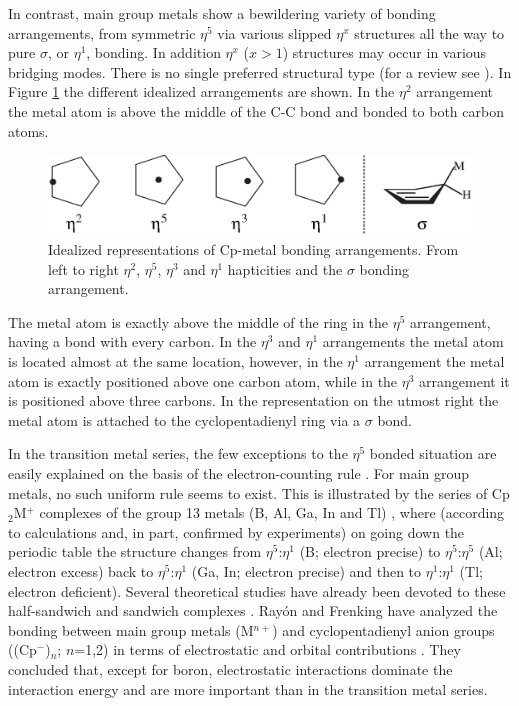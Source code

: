 In contrast, main group metals show a bewildering variety of bonding arrangements, from symmetric $\eta^{5}$ via various slipped $\eta^{x}$ structures all the way to pure $\sigma$, or $\eta^{1}$, bonding. In addition $\eta^{x}$ ($x>1$) structures may occur in various bridging modes. There is no single preferred structural type (for a review see \cite{jutzi}). In Figure \ref{ch4.fig.bondarr} the different idealized arrangements are shown. In the $\eta^2$ arrangement the metal atom is above the middle of the C-C bond and bonded to both carbon atoms.
\begin{figure}[ht]
\center
\includegraphics[scale=0.8]{cyclopentadienyl/figures/bondarrangements.eps}
\caption{Idealized representations of Cp-metal bonding arrangements. From left to right $\eta^2$, $\eta^5$, $\eta^3$ and $\eta^1$ hapticities and the $\sigma$ bonding arrangement.}
\label{ch4.fig.bondarr}
\end{figure}
The metal atom is exactly above the middle of the ring in the $\eta^5$ arrangement, having a bond with every carbon. In the $\eta^3$ and $\eta^1$ arrangements the metal atom is located almost at the same location, however, in the $\eta^1$ arrangement the metal atom is exactly positioned above one carbon atom, while in the $\eta^3$ arrangement it is positioned above three carbons. In the representation on the utmost right the metal atom is attached to the cyclopentadienyl ring via a $\sigma$ bond. 

In the transition metal series, the few exceptions to the $\eta^{5}$ bonded situation are easily explained on the basis of the electron-counting rule \cite{shriver}.
For main group metals, no such uniform rule seems to exist. This is illustrated by the series of Cp$_2$M$^{+}$ complexes of the group 13 metals (B, Al, Ga, In and Tl) \cite{macdonald}, where (according to calculations and, in part, confirmed by experiments) on going down the periodic table the structure changes from $\eta^{5}$:$\eta^{1}$ (B; electron precise) to $\eta^{5}$:$\eta^{5}$ (Al; electron excess) back to $\eta^{5}$:$\eta^{1}$ (Ga, In; electron precise) and then to $\eta^{1}$:$\eta^{1}$ (Tl; electron deficient). 
%
%
Several theoretical studies have already been devoted to these half-sandwich and sandwich complexes \cite{kwon}. Ray\'{o}n and Frenking have analyzed the bonding between main group metals (M$^{n+}$) and cyclopentadienyl anion groups ((Cp$^{-}$)$_n$; $n$=1,2) in terms of electrostatic and orbital contributions \cite{rayon}. They concluded that, except for boron, electrostatic interactions dominate the interaction energy and are more important than in the transition metal series.

